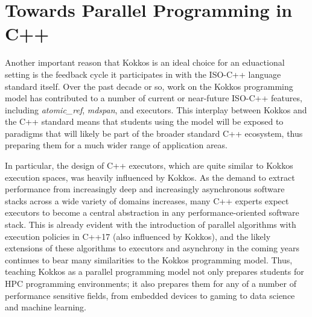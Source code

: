 
\section{Towards Parallel Programming in C++}\label{chap:c++}

Another important reason that Kokkos is an ideal choice for an eduactional setting is the feedback cycle it participates in with the ISO-C++ language standard itself.  Over the past decade or so, work on the Kokkos programming model has contributed to a number of current or near-future ISO-C++ features, including \emph{atomic\_ref}, \emph{mdspan}, and executors.  This interplay between Kokkos and the C++ standard means that students using the model will be exposed to paradigms that will likely be part of the broader standard C++ ecosystem, thus preparing them for a much wider range of application areas.

In particular, the design of C++ executors, which are quite similar to Kokkos execution spaces, was heavily influenced by Kokkos.  As the demand to extract performance from increasingly deep and increasingly asynchronous software stacks across a wide variety of domains increases, many C++ experts expect executors to become a central abstraction in any performance-oriented software stack.  This is already evident with the introduction of parallel algorithms with execution policies in C++17 (also influenced by Kokkos), and the likely extensions of these algorithms to executors and asynchrony in the coming years continues to bear many similarities to the Kokkos programming model.  Thus, teaching Kokkos as a parallel programming model not only prepares students for HPC programming environments; it also prepares them for any of a number of performance sensitive fields, from embedded devices to gaming to data science and machine learning.

